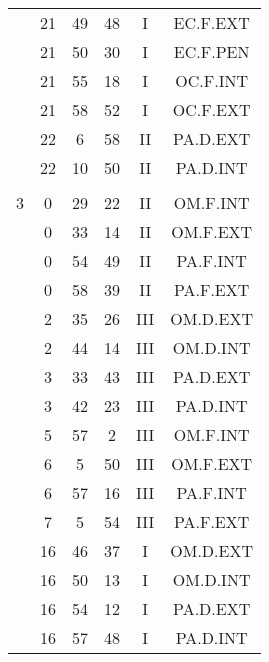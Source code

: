 \documentclass[12pt, a4paper]{article}
\begin{document}
\begin{multicols}{3}
{\begin{tabular}{c c c c c c}
	 	 	 	 & 21 & 49 & 48 & I & EC.F.EXT\\%
	 	 	 	 & 21 & 50 & 30 & I & EC.F.PEN\\%
	 	 	 	 & 21 & 55 & 18 & I & OC.F.INT\\%
	 	 	 	 & 21 & 58 & 52 & I & OC.F.EXT\\%
	 	 	 	 & 22 & 6 & 58 & II & PA.D.EXT\\%
	 	 	 	 & 22 & 10 & 50 & II & PA.D.INT\\%
	 	 	 	 & & & & & \\%
	 	 	 	3 & 0 & 29 & 22 & II & OM.F.INT\\%
	 	 	 	 & 0 & 33 & 14 & II & OM.F.EXT\\%
	 	 	 	 & 0 & 54 & 49 & II & PA.F.INT\\%
	 	 	 	 & 0 & 58 & 39 & II & PA.F.EXT\\%
	 	 	 	 & 2 & 35 & 26 & III & OM.D.EXT\\%
	 	 	 	 & 2 & 44 & 14 & III & OM.D.INT\\%
	 	 	 	 & 3 & 33 & 43 & III & PA.D.EXT\\%
	 	 	 	 & 3 & 42 & 23 & III & PA.D.INT\\%
	 	 	 	 & 5 & 57 & 2 & III & OM.F.INT\\%
	 	 	 	 & 6 & 5 & 50 & III & OM.F.EXT\\%
	 	 	 	 & 6 & 57 & 16 & III & PA.F.INT\\%
	 	 	 	 & 7 & 5 & 54 & III & PA.F.EXT\\%
	 	 	 	 & 16 & 46 & 37 & I & OM.D.EXT\\%
	 	 	 	 & 16 & 50 & 13 & I & OM.D.INT\\%
	 	 	 	 & 16 & 54 & 12 & I & PA.D.EXT\\%
	 	 	 	 & 16 & 57 & 48 & I & PA.D.INT\\%

\end{tabular}}
\end{multicols}
\end{document}

